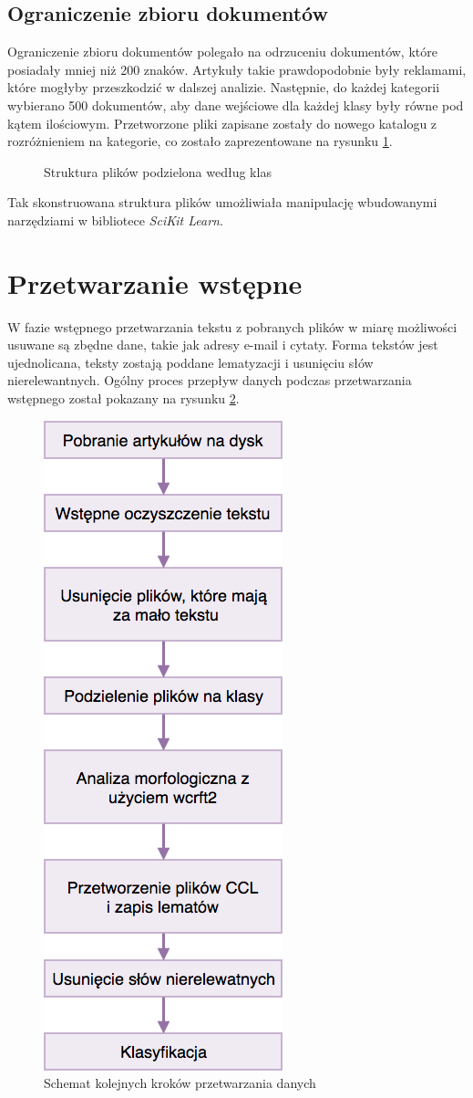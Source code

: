 \subsection{Ograniczenie zbioru dokumentów}
Ograniczenie zbioru dokumentów polegało na odrzuceniu dokumentów, które posiadały mniej niż 200 znaków. Artykuły takie prawdopodobnie były reklamami, które mogłyby przeszkodzić w dalszej analizie. Następnie, do każdej kategorii wybierano 500 dokumentów, aby dane wejściowe dla każdej klasy były równe pod kątem ilościowym. Przetworzone pliki zapisane zostały do nowego katalogu z rozróżnieniem na kategorie, co zostało zaprezentowane na rysunku \ref{dir-by-categories}.

\begin{figure}[ht!]

\caption{Struktura plików podzielona według klas}
\label{dir-by-categories}
\end{figure}

Tak skonstruowana struktura plików umożliwiała manipulację wbudowanymi narzędziami w bibliotece \textit{SciKit Learn}.


\section{Przetwarzanie wstępne}
W fazie wstępnego przetwarzania tekstu z pobranych plików w miarę możliwości usuwane są zbędne dane, takie jak adresy e-mail i cytaty. Forma tekstów jest ujednolicana, teksty zostają poddane lematyzacji i usunięciu słów nierelewantnych. Ogólny proces przepływ danych podczas przetwarzania wstępnego został pokazany na rysunku \ref{fig:process-flow}.

\begin{figure}[ht!]
	\centering
	\includegraphics[width=0.3\linewidth]{img/process-flow}
	\caption{Schemat kolejnych kroków przetwarzania danych}
	\label{fig:process-flow}
\end{figure}

